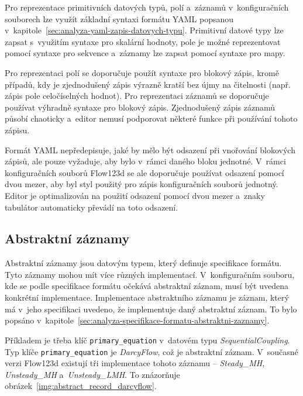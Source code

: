 \documentclass[FM,bw,DP]{tulthesis}
\begin{document}
Pro reprezentace primitivních datových typů, polí a~záznamů v~konfiguračních souborech lze využít základní syntaxi formátu \gls{YAML} popsanou v~kapitole~\ref{sec:analyza-yaml-zapis-datovych-typu}. Primitivní datové typy lze zapsat s~využitím syntaxe pro skalární hodnoty, pole je možné reprezentovat pomocí syntaxe pro sekvence a~záznamy lze zapsat pomocí syntaxe pro mapy.

Pro reprezentaci polí se doporučuje použít syntaxe pro blokový zápis, kromě případů, kdy je zjednodušený zápis výrazně kratší bez újmy na čitelnosti (např. zápis pole celočíselných hodnot). Pro reprezentaci záznamů se doporučuje používat výhradně syntaxe pro blokový zápis. Zjednodušený zápis záznamů působí chaoticky a~editor nemusí podporovat některé funkce při používání tohoto zápisu.

Formát \gls{YAML} nepředepisuje, jaké by mělo být odsazení při vnořování blokových zápisů, ale pouze vyžaduje, aby bylo v~rámci daného bloku jednotné. V~rámci konfiguračních souborů Flow123d se ale doporučuje používat odsazení pomocí dvou mezer, aby byl styl použitý pro zápis konfiguračních souborů jednotný. Editor je optimalizován na použití odsazení pomocí dvou mezer a~znaky tabulátor automaticky převádí na toto odsazení.

\subsection{Abstraktní záznamy}
\label{sec:navrh-yaml-abstrakni-zaznamy}
Abstraktní záznamy jsou datovým typem, který definuje specifikace formátu. Tyto záznamy mohou mít více různých implementací. V~konfiguračním souboru, kde se podle specifikace formátu očekává abstraktní záznam, musí být uvedena konkrétní implementace. Implementace abstraktního záznamu je záznam, který má v~jeho specifikaci uvedeno, že implementuje daný abstraktní záznam. To bylo popsáno v~kapitole~\ref{sec:analyza-specifikace-formatu-abstraktni-zaznamy}.

Příkladem je třeba klíč \texttt{primary\_equation} v~datovém typu \textit{SequentialCoupling}. Typ klíče \texttt{primary\_equation} je \textit{DarcyFlow}, což je abstraktní záznam. V~současné verzi Flow123d existují tři implementace tohoto záznamu -- \textit{Steady\_MH}, \textit{Unsteady\_MH} a~\textit{Unsteady\_LMH}. To znázorňuje obrázek~\ref{img:abstract_record_darcyflow}.
\end{document}

